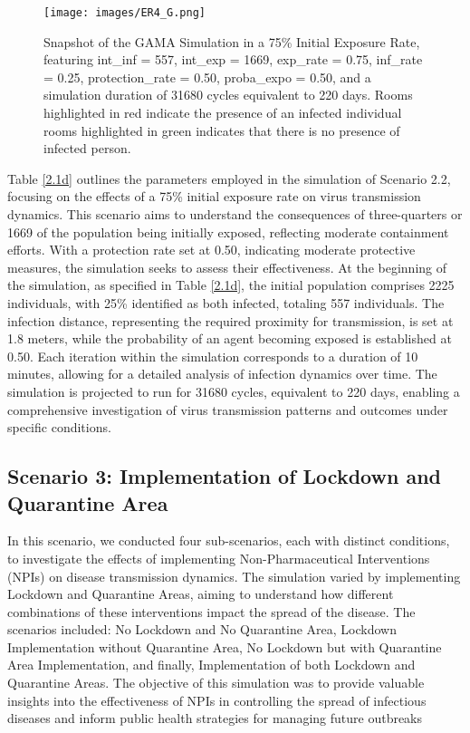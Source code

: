 	\begin{figure}[H]
	\centering
	\texttt{[image: images/ER4\_G.png]}
	\caption{Snapshot of the GAMA Simulation in a 75\% Initial Exposure Rate, featuring int\_inf = 557, int\_exp = 1669, exp\_rate = 0.75, inf\_rate = 0.25, protection\_rate = 0.50, proba\_expo = 0.50, and a simulation duration of 31680 cycles equivalent to 220 days. Rooms highlighted in red indicate the presence of an infected individual rooms highlighted in green indicates that there is no presence of infected person.}
	\label{ER3G}
\end{figure}

Table \ref{2.1d} outlines the parameters employed in the simulation of Scenario 2.2, focusing on the effects of a 75\% initial exposure rate on virus transmission dynamics. This scenario aims to understand the consequences of three-quarters or 1669 of the population being initially exposed, reflecting moderate containment efforts. With a protection rate set at 0.50, indicating moderate protective measures, the simulation seeks to assess their effectiveness. At the beginning of the simulation, as specified in Table \ref{2.1d}, the initial population comprises 2225 individuals, with 25\% identified as both infected, totaling 557 individuals. The infection distance, representing the required proximity for transmission, is set at 1.8 meters, while the probability of an agent becoming exposed is established at 0.50. Each iteration within the simulation corresponds to a duration of 10 minutes, allowing for a detailed analysis of infection dynamics over time. The simulation is projected to run for 31680 cycles, equivalent to 220 days, enabling a comprehensive investigation of virus transmission patterns and outcomes under specific conditions.



\subsection{ Scenario 3: Implementation of Lockdown and Quarantine Area}
In this scenario, we conducted four sub-scenarios, each with distinct conditions, to investigate the effects of implementing Non-Pharmaceutical Interventions (NPIs) on disease transmission dynamics. The simulation varied by implementing Lockdown and Quarantine Areas, aiming to understand how different combinations of these interventions impact the spread of the disease. The scenarios included: No Lockdown and No Quarantine Area, Lockdown Implementation without Quarantine Area, No Lockdown but with Quarantine Area Implementation, and finally, Implementation of both Lockdown and Quarantine Areas. The objective of this simulation was to provide valuable insights into the effectiveness of NPIs in controlling the spread of infectious diseases and inform public health strategies for managing future outbreaks 

